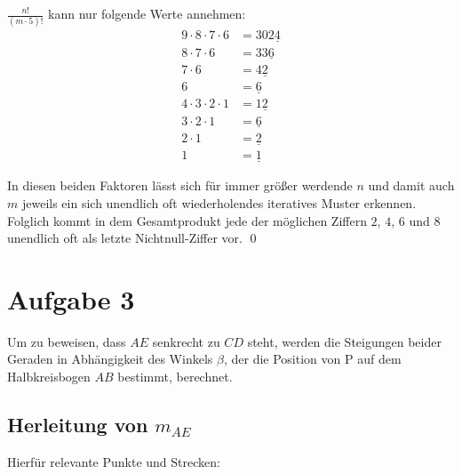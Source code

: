 \documentclass[12pt,a4paper,oneside]{article}
\begin{document}
$\frac{n!}{(m\cdot5)!}$ kann nur folgende Werte annehmen:
\begin{equation*}
	\begin{split}
		9\cdot8\cdot7\cdot6 &= 302\underline{4} \\
		8\cdot7\cdot6 &= 33\underline{6} \\
		7\cdot6 &= 4\underline{2} \\
		6 &= \underline{6} \\
		4\cdot3\cdot2\cdot1 &= 1\underline{2} \\
		3\cdot2\cdot1 &= \underline{6} \\
		2\cdot1 &= \underline{2} \\
		1 &= \underline{1}
	\end{split}
\end{equation*}

In diesen beiden Faktoren lässt sich für immer größer werdende $n$ und damit auch $m$ jeweils ein sich unendlich oft wiederholendes iteratives Muster erkennen. Folglich kommt in dem Gesamtprodukt jede der möglichen Ziffern $2$, $4$, $6$ und $8$ unendlich oft als letzte Nichtnull-Ziffer vor. \qed

\pagebreak
\section[]{Aufgabe 3}
\setlength{\mathindent}{4cm}

Um zu beweisen, dass $AE$ senkrecht zu $CD$ steht, werden die Steigungen beider Geraden in Abhängigkeit des Winkels $\beta$, der die Position von P auf dem Halbkreisbogen $AB$ bestimmt, berechnet.

\subsection[]{Herleitung von $m_{AE}$}
Hierfür relevante Punkte und Strecken:
\end{document}
